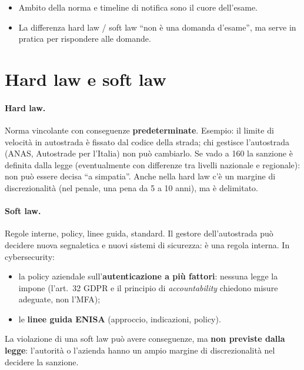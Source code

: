 \begin{esame}
\begin{itemize}
  \item Ambito della norma e timeline di notifica sono il cuore dell'esame.
  \item La differenza hard law / soft law ``non è una domanda d'esame'', ma serve in pratica per
    rispondere alle domande.
\end{itemize}
\end{esame}

\section{Hard law e soft law}
\paragraph{Hard law.} Norma vincolante con conseguenze \textbf{predeterminate}. Esempio: il limite di
velocità in autostrada è fissato dal codice della strada; chi gestisce l'autostrada (ANAS, Autostrade
per l'Italia) non può cambiarlo. Se vado a 160 la sanzione è definita dalla legge (eventualmente con
differenze tra livelli nazionale e regionale): non può essere decisa ``a simpatia''. Anche nella
hard law c'è un margine di discrezionalità (nel penale, una pena da 5 a 10 anni), ma è delimitato.

\paragraph{Soft law.} Regole interne, policy, linee guida, standard. Il gestore dell'autostrada può
decidere nuova segnaletica e nuovi sistemi di sicurezza: è una regola interna. In cybersecurity:
\begin{itemize}
  \item la policy aziendale sull'\textbf{autenticazione a più fattori}: nessuna legge la impone (l'art.~32
    GDPR e il principio di \emph{accountability} chiedono misure adeguate, non l'MFA);
  \item le \textbf{linee guida ENISA} (approccio, indicazioni, policy).
\end{itemize}
La violazione di una soft law può avere conseguenze, ma \textbf{non previste dalla legge}: l'autorità
o l'azienda hanno un ampio margine di discrezionalità nel decidere la sanzione.


